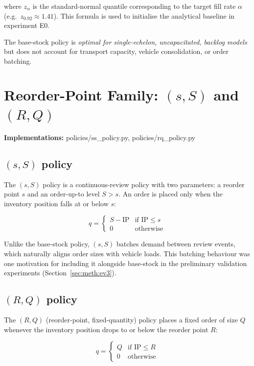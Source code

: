 where $z_\alpha$ is the standard-normal quantile corresponding to the
target fill rate $\alpha$ (e.g.\ $z_{0.92} \approx 1.41$).  This formula
is used to initialise the analytical baseline in experiment E0.

The base-stock policy is \emph{optimal for single-echelon, uncapacitated,
backlog models} but does not account for transport capacity, vehicle
consolidation, or order batching.

\section{Reorder-Point Family: $(s,S)$ and $(R,Q)$}
\label{sec:policies:sS}

\textbf{Implementations:} policies/ss\_policy.py,
policies/rq\_policy.py

\subsection{$(s,S)$ policy}

The $(s,S)$ policy is a continuous-review policy with two parameters:
a reorder point $s$ and an order-up-to level $S > s$.  An order is
placed only when the inventory position falls at or below $s$:

\begin{equation}
  q =
  \begin{cases}
    S - \text{IP} & \text{if } \text{IP} \leq s \\
    0             & \text{otherwise}
  \end{cases}
\end{equation}

Unlike the base-stock policy, $(s,S)$ batches demand between review events,
which naturally aligns order sizes with vehicle loads.  This batching
behaviour was one motivation for including it alongside base-stock in the
preliminary validation experiments (Section~\ref{sec:meth:ev3}).

\subsection{$(R,Q)$ policy}

The $(R,Q)$ (reorder-point, fixed-quantity) policy places a fixed
order of size $Q$ whenever the inventory position drops to or below the
reorder point $R$:

\begin{equation}
  q =
  \begin{cases}
    Q & \text{if } \text{IP} \leq R \\
    0 & \text{otherwise}
  \end{cases}
\end{equation}

